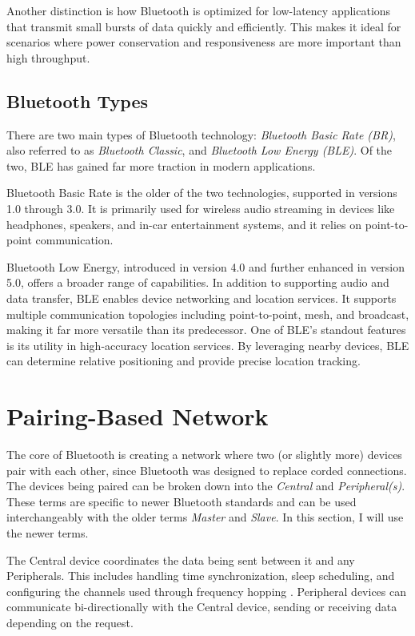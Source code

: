 Another distinction is how Bluetooth is optimized for low-latency applications that transmit small bursts of data quickly and efficiently.
This makes it ideal for scenarios where power conservation and responsiveness are more important than high throughput.

\subsection{Bluetooth Types}

There are two main types of Bluetooth technology: \textit{Bluetooth Basic Rate (BR)}, also referred to as \textit{Bluetooth Classic}, and \textit{Bluetooth Low Energy (BLE)}. Of the two, BLE has gained far more traction in modern applications.

Bluetooth Basic Rate is the older of the two technologies, supported in versions 1.0 through 3.0. It is primarily used for wireless audio streaming in devices like headphones, speakers, and in-car entertainment systems, and it relies on point-to-point communication.

Bluetooth Low Energy, introduced in version 4.0 and further enhanced in version 5.0, offers a broader range of capabilities. In addition to supporting audio and data transfer, BLE enables device networking and location services. It supports multiple communication topologies including point-to-point, mesh, and broadcast, making it far more versatile than its predecessor. One of BLE’s standout features is its utility in high-accuracy location services. By leveraging nearby devices, BLE can determine relative positioning and provide precise location tracking.

\section{Pairing-Based Network}

The core of Bluetooth is creating a network where two (or slightly more) devices pair with each other, since Bluetooth was designed to replace corded connections. The devices being paired can be broken down into the \textit{Central} and \textit{Peripheral(s)}. These terms are specific to newer Bluetooth standards and can be used interchangeably with the older terms \textit{Master} and \textit{Slave}. In this section, I will use the newer terms.

The Central device coordinates the data being sent between it and any Peripherals. This includes handling time synchronization, sleep scheduling, and configuring the channels used through frequency hopping \cite{nextgenBLE}. Peripheral devices can communicate bi-directionally with the Central device, sending or receiving data depending on the request.

